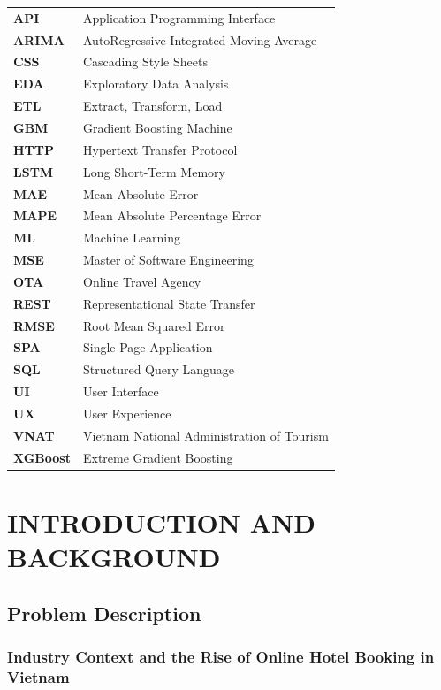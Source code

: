 \documentclass[12pt,a4paper]{report}
\begin{document}
\begin{longtable}{p{3cm} p{12cm}}
\textbf{API} & Application Programming Interface \\
\textbf{ARIMA} & AutoRegressive Integrated Moving Average \\
\textbf{CSS} & Cascading Style Sheets \\
\textbf{EDA} & Exploratory Data Analysis \\
\textbf{ETL} & Extract, Transform, Load \\
\textbf{GBM} & Gradient Boosting Machine \\
\textbf{HTTP} & Hypertext Transfer Protocol \\
\textbf{LSTM} & Long Short-Term Memory \\
\textbf{MAE} & Mean Absolute Error \\
\textbf{MAPE} & Mean Absolute Percentage Error \\
\textbf{ML} & Machine Learning \\
\textbf{MSE} & Master of Software Engineering \\
\textbf{OTA} & Online Travel Agency \\
\textbf{REST} & Representational State Transfer \\
\textbf{RMSE} & Root Mean Squared Error \\
\textbf{SPA} & Single Page Application \\
\textbf{SQL} & Structured Query Language \\
\textbf{UI} & User Interface \\
\textbf{UX} & User Experience \\
\textbf{VNAT} & Vietnam National Administration of Tourism \\
\textbf{XGBoost} & Extreme Gradient Boosting \\
\end{longtable}

\chapter{INTRODUCTION AND BACKGROUND}

\section{Problem Description}

\subsection{Industry Context and the Rise of Online Hotel Booking in Vietnam}
\end{document}
